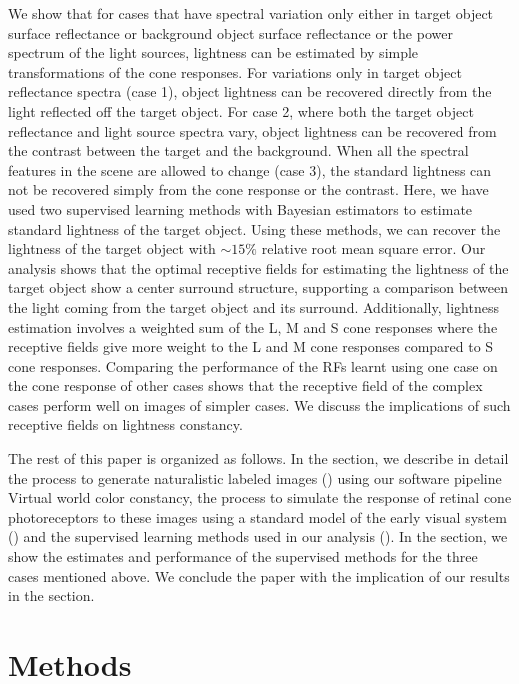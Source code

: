 \documentclass{jov}
\begin{document}
We show that for cases that have spectral variation only either in target object surface reflectance or background object surface reflectance or the power spectrum of the light sources, lightness can be estimated by simple transformations of the cone responses. For variations only in target object reflectance spectra (case 1), object lightness can be recovered directly from the light reflected off the target object. For case 2, where both the target object reflectance and light source spectra vary, object lightness can be recovered from the contrast between the target and the background. When all the spectral features in the scene are allowed to change (case 3), the standard lightness can not be recovered simply from the cone response or the contrast. Here, we have used two supervised learning methods with Bayesian estimators to estimate standard lightness of the target object. Using these methods, we can recover the lightness of the target object with $\sim 15\%$ relative root mean square error.  Our analysis shows that the optimal receptive fields for estimating the lightness of the target object show a center surround structure, supporting a comparison between the light coming from the target object and its surround. Additionally, lightness estimation involves a weighted sum of the L, M and S cone responses where the receptive fields give more weight to the L and M cone responses compared to S cone responses. Comparing the performance of the RFs learnt using  one case on the cone response of other cases shows that the receptive field of the complex cases perform well on images of simpler cases. We discuss the implications of such receptive fields on lightness constancy. 

The rest of this paper is organized as follows. In the  section, we describe in detail the process to generate naturalistic labeled images () using our software pipeline {\rm Virtual world color constancy}, the process to simulate the response of retinal cone photoreceptors to these images using a standard model of the early visual system () and the supervised learning methods used in our analysis (). In the  section, we show the estimates and performance of the supervised methods for the three cases mentioned above. We conclude the paper with the implication of our results in the  section.  

\section*{Methods} \label{Methods}
\end{document}
